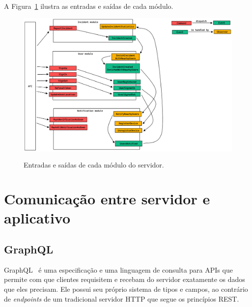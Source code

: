 \FloatBarrier

A Figura~\ref{f.system_server_all_modules_commands-observers-events} ilustra as entradas e saídas de cada módulo.

\begin{figure}[htbp]
	\caption{\small Entradas e saídas de cada módulo do servidor.}
	\centering
	\includegraphics[width=\textwidth]{../diagrams/out/system_server_all_modules_commands-observers-events.png}
	\label{f.system_server_all_modules_commands-observers-events}
\end{figure}

\FloatBarrier



\section{Comunicação entre servidor e aplicativo}

\subsection{GraphQL}

GraphQL~\cite{graphql} é uma especificação e uma linguagem de consulta para APIs que permite com que clientes requisitem e recebam do servidor exatamente os dados que eles precisam. Ele possui seu próprio sistema de tipos e campos, ao contrário de \emph{endpoints} de um tradicional servidor HTTP que segue os princípios REST.

